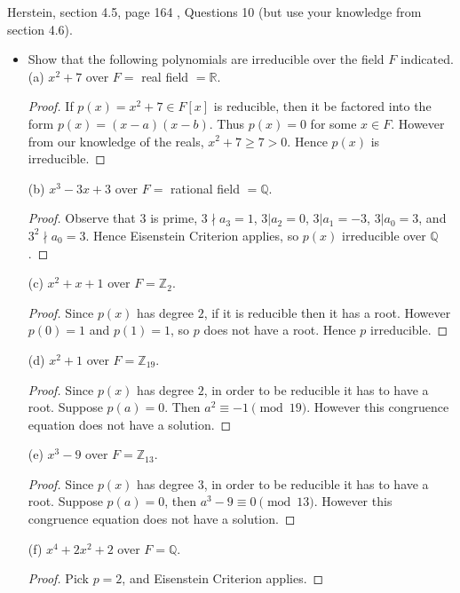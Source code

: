 
Herstein, section 4.5, page 164 , Questions 10 (but use your knowledge from section 4.6). 

\begin{itemize}
	\item [10.] Show that the following polynomials are irreducible over the field $F$ indicated.\\
(a) $x^2+7$ over $F=$ real field $=\mathbb{R}$.
\begin{proof}
	If $p(x) = x^2 + 7 \in F[x]$ is reducible, then it be factored into the form  $p(x) = (x-a)(x-b)$. Thus $p(x) = 0$ for some $x \in F$. However from our knowledge of the reals, $x^2 + 7 \ge  7 > 0$. Hence $p(x)$ is irreducible.
\end{proof}

(b) $x^3-3 x+3$ over $F=$ rational field $=\mathbb{Q}$.
\begin{proof}
	Observe that $3$ is prime, $3 \nmid a_3=1$, $3 | a_2 = 0$, $3 | a_1 = -3$, $3 | a_0 = 3$, and $3^2 \nmid a_0 = 3$. Hence Eisenstein Criterion applies, so $p(x)$ irreducible over $\mathbb{Q}$.
\end{proof}

(c) $x^2+x+1$ over $F=\mathbb{Z}_2$.
\begin{proof}
	Since $p(x)$ has degree $2$, if it is reducible then it has a root. However $p(0) = 1$ and $p(1) = 1$, so $p$ does not have a root. Hence $p$ irreducible.
\end{proof}

(d) $x^2+1$ over $F=\mathbb{Z}_{19}$.
\begin{proof}
	Since $p(x)$ has degree $2$, in order to be reducible it has to have a root. Suppose $p(a) = 0$. Then  $a^2  \equiv -1 \pmod {19}$. However this congruence equation does not have a solution.
\end{proof}

(e) $x^3-9$ over $F=\mathbb{Z}_{13}$.
\begin{proof}
	Since $p(x)$ has degree $3$, in order to be reducible it has to have a root. Suppose $p(a) = 0$, then $a^3 - 9 \equiv 0 \pmod {13}$. However this congruence equation does not have a solution.
\end{proof}

(f) $x^4+2 x^2+2$ over $F=\mathbb{Q}$.
\begin{proof}
	Pick $p = 2$, and Eisenstein Criterion applies.
\end{proof}


\end{itemize}
\newpage

